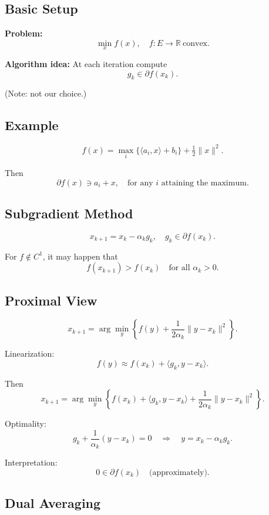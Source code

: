 \documentclass[12pt,oneside]{book}
\numberwithin{equation}{section}
\theoremstyle{definition}
\theoremstyle{plain}
\theoremstyle{remark}
\begin{document}
\subsection*{Basic Setup}

\textbf{Problem:}
\[
\min_x f(x), \quad f:E \to \mathbb{R} \ \text{convex}.
\]

\textbf{Algorithm idea:}
At each iteration compute
\[
g_k \in \partial f(x_k).
\]

(Note: not our choice.)

\subsection*{Example}

\[
f(x) = \max_i \{\langle a_i,x\rangle + b_i\} + \tfrac{1}{2}\|x\|^2.
\]

Then
\[
\partial f(x) \ni a_i + x,
\quad \text{for any } i \text{ attaining the maximum}.
\]

\subsection{Subgradient Method}

\[
x_{k+1} = x_k - \alpha_k g_k, \quad g_k \in \partial f(x_k).
\]

For $f \notin C^1$, it may happen that
\[
f(x_{k+1}) > f(x_k)
\quad \text{for all } \alpha_k > 0.
\]

\subsection*{Proximal View}

\[
x_{k+1} = \arg\min_y \left\{ f(y) + \frac{1}{2\alpha_k}\|y-x_k\|^2 \right\}.
\]

Linearization:
\[
f(y) \approx f(x_k) + \langle g_k, y-x_k\rangle.
\]

Then
\[
x_{k+1} = \arg\min_y \left\{ f(x_k) + \langle g_k,y-x_k\rangle + \frac{1}{2\alpha_k}\|y-x_k\|^2 \right\}.
\]

Optimality:
\[
g_k + \frac{1}{\alpha_k}(y-x_k) = 0
\quad \Longrightarrow \quad
y = x_k - \alpha_k g_k.
\]

Interpretation:
\[
0 \in \partial f(x_k) \quad \text{(approximately)}.
\]

\subsection{Dual Averaging}
\end{document}
